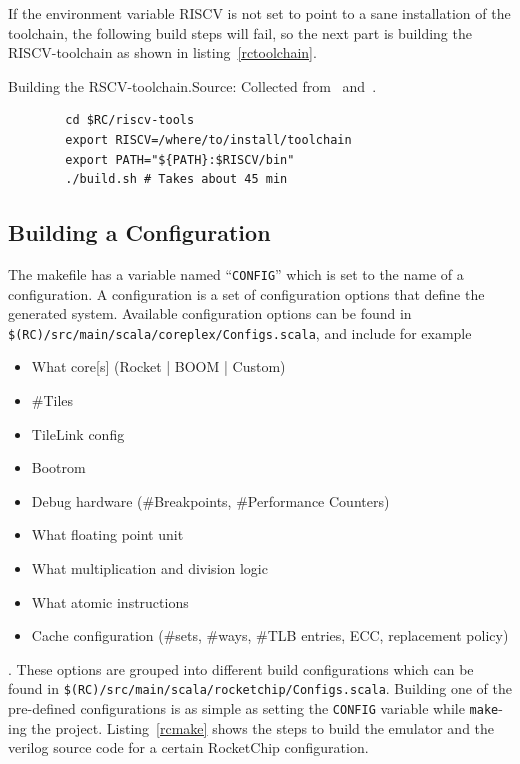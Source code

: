 \documentclass[journal,a4paper]{IEEEtran}
\begin{document}
If the environment variable RISCV is not set to point to a sane installation of the toolchain, the following build steps will fail, so the next part is building the RISCV-toolchain as shown in listing~\ref{rctoolchain}.


\begin{table}
	\caption{Building the RSCV-toolchain.\newline\hspace{\linewidth}Source: Collected from~\cite{rc_github} and~\cite{boom_github}.}
	\label{rctoolchain}
	\begin{verbatim}
		cd $RC/riscv-tools
		export RISCV=/where/to/install/toolchain
		export PATH="${PATH}:$RISCV/bin"
		./build.sh # Takes about 45 min
	\end{verbatim}
\end{table}


\subsection{Building a Configuration}
The makefile has a variable named ``\texttt{CONFIG}'' which is set to the name of a configuration.
A configuration is a set of configuration options that define the generated system.
Available configuration options can be found in \texttt{\$(RC)/src/main/scala/coreplex/Configs.scala}, and include for example


\begin{itemize}
	\item What core[s] (Rocket | BOOM | Custom)
	\item \#Tiles
	\item TileLink config
	\item Bootrom
	\item Debug hardware (\#Breakpoints, \#Performance Counters)
	\item What floating point unit
	\item What multiplication and division logic
	\item What atomic instructions
	\item Cache configuration (\#sets, \#ways, \#TLB entries, ECC, replacement policy)
\end{itemize}
.
These options are grouped into different build configurations which can be found in \texttt{\$(RC)/src/main/scala/rocketchip/Configs.scala}.
Building one of the pre-defined configurations is as simple as setting the \texttt{CONFIG} variable while \texttt{make}-ing the project. Listing~\ref{rcmake} shows the steps to build the emulator and the verilog source code for a certain RocketChip configuration.
\end{document}
